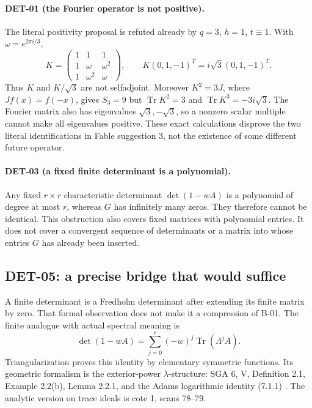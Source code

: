 \documentclass[11pt,a4paper]{article}
\newcommand{\Tr}{\operatorname{Tr}}
\newcommand{\fid}[1]{\textsf{#1}}
\begin{document}
\paragraph{DET-01 (the Fourier operator is not positive).}
The literal positivity proposal is refuted already by $q=3$, $h=1$, $t\equiv1$. With $\omega=e^{2\pi i/3}$,
\[
 K=\begin{pmatrix}1&1&1\\1&\omega&\omega^2\\1&\omega^2&\omega\end{pmatrix},\qquad
 K(0,1,-1)^T=i\sqrt3(0,1,-1)^T.
\]
Thus $K$ and $K/\sqrt3$ are not selfadjoint. Moreover $K^2=3J$, where $Jf(x)=f(-x)$, gives $S_3=9$ but $\Tr K^2=3$ and $\Tr K^3=-3i\sqrt3$. The Fourier matrix also has eigenvalues $\sqrt3,-\sqrt3$, so a nonzero scalar multiple cannot make all eigenvalues positive. These exact calculations disprove the two literal identifications in Fable suggestion 3, not the existence of some different future operator.

\paragraph{DET-03 (a fixed finite determinant is a polynomial).}
Any fixed $r\times r$ characteristic determinant $\det(1-wA)$ is a polynomial of degree at most $r$, whereas $G$ has infinitely many zeros. They therefore cannot be identical. This obstruction also covers fixed matrices with polynomial entries. It does not cover a convergent sequence of determinants or a matrix into whose entries $G$ has already been inserted.

\subsection{DET-05: a precise bridge that would suffice}
A finite determinant is a Fredholm determinant after extending its finite matrix by zero. That formal observation does not make it a compression of \fid{B-01}. The finite analogue with actual spectral meaning is
\[
 \det(1-wA)=\sum_{j=0}^{r}(-w)^j\Tr(\Lambda^jA).
\]
Triangularization proves this identity by elementary symmetric functions. Its geometric formalism is the exterior-power $\lambda$-structure: SGA 6, V, Definition 2.1, Example 2.2(b), Lemma 2.2.1, and the Adams logarithmic identity (7.1.1) \cite{sga6}. The analytic version on trace ideals is cote 1, scans 78--79.
\end{document}
